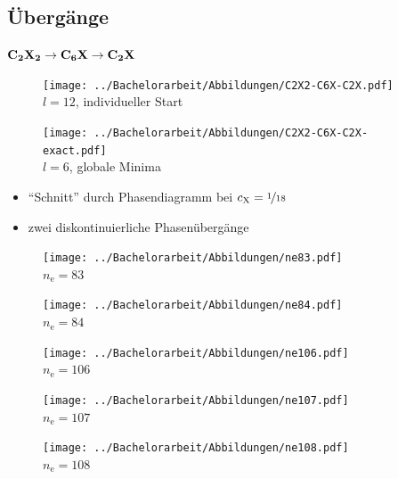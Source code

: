 \documentclass{beamer}
\def \nE {n_\mathrm{e}}
\def \cX {c_\mathrm{X}}
\begin{document}
	\subsection{Übergänge}

	\begin{frame}{$\bf C_{\boldsymbol 2}X_{\boldsymbol 2} \rightarrow C_{\boldsymbol 6}X \rightarrow C_{\boldsymbol 2}X$}
		\begin{figure}
			\scriptsize
			\begin{minipage}{0.48\textwidth}
				\centering
				\texttt{[image: ../Bachelorarbeit/Abbildungen/C2X2-C6X-C2X.pdf]} \\
				$l = 12$, individueller Start
			\end{minipage}
			\hfill
			\begin{minipage}{0.48\textwidth}
				\centering
				\texttt{[image: ../Bachelorarbeit/Abbildungen/C2X2-C6X-C2X-exact.pdf]} \\
				$l = 6$, globale Minima
			\end{minipage}
		\end{figure}
		\begin{itemize}
			\item "`Schnitt"' durch Phasendiagramm bei $\cX = \nicefrac 1 {18}$
			\item zwei diskontinuierliche Phasenübergänge
		\end{itemize}
		\begin{figure}
			\scriptsize
			\begin{minipage}[b]{0.19\textwidth}
				\centering
				\texttt{[image: ../Bachelorarbeit/Abbildungen/ne83.pdf]} \\
				$\nE = 83$
			\end{minipage}
			\hfill
			\begin{minipage}[b]{0.19\textwidth}
				\centering
				\texttt{[image: ../Bachelorarbeit/Abbildungen/ne84.pdf]} \\
				$\nE = 84$
			\end{minipage}
			\hfill
			\begin{minipage}[b]{0.19\textwidth}
				\centering
				\texttt{[image: ../Bachelorarbeit/Abbildungen/ne106.pdf]} \\
				$\nE = 106$
			\end{minipage}
			\hfill
			\begin{minipage}[b]{0.19\textwidth}
				\centering
				\texttt{[image: ../Bachelorarbeit/Abbildungen/ne107.pdf]} \\
				$\nE = 107$
			\end{minipage}
			\hfill
			\begin{minipage}[b]{0.19\textwidth}
				\centering
				\texttt{[image: ../Bachelorarbeit/Abbildungen/ne108.pdf]} \\
				$\nE = 108$
			\end{minipage}
		\end{figure}
	\end{frame}
	
\end{document}
